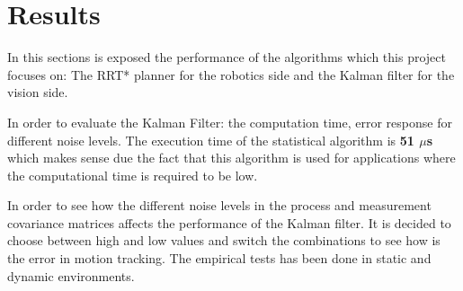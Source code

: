 \section{Results}

In this sections is exposed the performance of the algorithms which this project focuses on: The RRT* planner for the robotics side and the Kalman filter for the vision side.

In order to evaluate the Kalman Filter: the computation time, error response for different noise levels. The execution time of the statistical algorithm is \textbf{51 $\mu$s} which makes sense due the fact that this algorithm is used for applications where the computational time is required to be low.

In order to see how the different noise levels in the process and measurement covariance matrices affects the performance of the Kalman filter. It is decided to choose between high and low values and switch the combinations to see how is the error in motion tracking. The empirical tests has been done in static and dynamic environments.
